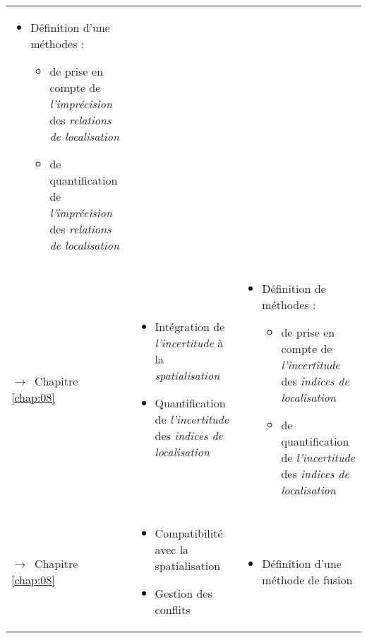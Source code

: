 \begin{tabular}{L{.2\textheight}L{.35\textheight}L{.35\textheight}}
\begin{minipage}{.35\textheight}
    \begin{itemize}
    \item Définition d'une méthodes :
      \begin{itemize}
      \item de prise en compte de \emph{l’imprécision} des
        \emph{relations de localisation}
      \item de quantification de \emph{l'imprécision} des
        \emph{relations de localisation}
      \end{itemize}
    \end{itemize}
  \end{minipage} \\
  \addlinespace[.5cm]
  
{\par\footnotesize\hspace{.25cm}$\longrightarrow$~Chapitre
\ref{chap:08}} & \begin{minipage}{.35\textheight}
    \begin{itemize}
    \item Intégration de \emph{l'incertitude} à la
      \emph{spatialisation}
    \item Quantification de \emph{l'incertitude} des \emph{indices de
        localisation}
    \end{itemize}
  \end{minipage}& \begin{minipage}{.35\textheight}
    \begin{itemize}
    \item Définition de méthodes :
      \begin{itemize}
      \item de prise en compte de \emph{l’incertitude} des
        \emph{indices de localisation}
      \item de quantification de \emph{l'incertitude} des
        \emph{indices de localisation}
      \end{itemize}
    \end{itemize}
  \end{minipage} \\

{\par\footnotesize\hspace{.25cm}$\longrightarrow$~Chapitre
\ref{chap:08}} & \begin{minipage}{.35\textheight}
    \begin{itemize}
    \item Compatibilité avec la spatialisation
    \item Gestion des conflits
    \end{itemize}
  \end{minipage}& \begin{minipage}{.35\textheight}
    \begin{itemize}
    \item Définition d'une méthode de fusion
    \end{itemize}
  \end{minipage} \\
  

\end{tabular}
